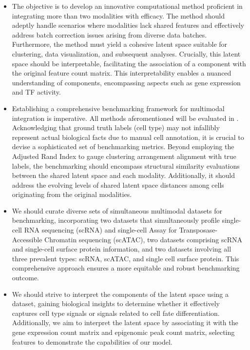 \begin{itemize}
	\item 
	The objective is to develop an innovative computational method proficient in integrating more than two modalities with efficacy. The method should adeptly handle scenarios where modalities lack shared features and effectively address batch correction issues arising from diverse data batches. Furthermore, the method must yield a cohesive latent space suitable for clustering, data visualization, and subsequent analyses. Crucially, this latent space should be interpretable, facilitating the association of a component with the original feature count matrix. This interpretability enables a nuanced understanding of components, encompassing aspects such as gene expression and TF activity.
	\item 
	Establishing a comprehensive benchmarking framework for multimodal integration is imperative. All methods aferomentioned will be evaluated in . Acknowledging that ground truth labels (cell type) may not infallibly represent actual biological facts due to manual cell annotation, it is crucial to devise a sophisticated set of benchmarking metrics. Beyond employing the Adjusted Rand Index to gauge clustering arrangement alignment with true labels, the benchmarking should encompass structural similarity evaluations between the shared latent space and each modality. Additionally, it should address the evolving levels of shared latent space distances among cells originating from the original modalities.
 
	\item 
	We should curate diverse sets of simultaneous multimodal datasets for benchmarking, incorporating two datasets that simultaneously profile single-cell RNA sequencing (scRNA) and single-cell Assay for Transposase-Accessible Chromatin sequencing (scATAC), two datasets comprising scRNA and single-cell surface protein information, and two datasets involving all three prevalent types: scRNA, scATAC, and single cell surface protein. This comprehensive approach ensures a more equitable and robust benchmarking outcome.

	\item 
	We should strive to interpret the components of the latent space using a dataset, gaining biological insights to determine whether it effectively captures cell type signals or signals related to cell fate differentiation. Additionally, we aim to interpret the latent space by associating it with the gene expression count matrix and epigenomic peak count matrix, selecting features to demonstrate the capabilities of our model.
\end{itemize}
\FloatBarrier %

